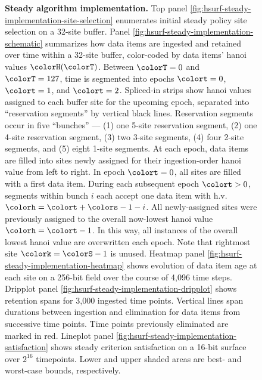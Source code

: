 \begin{figure}[htbp!]
\vspace{-2ex}\caption{%
  \textbf{Steady algorithm implementation.}
  \footnotesize
  Top panel \ref{fig:hsurf-steady-implementation-site-selection} enumerates initial steady policy site selection on a 32-site buffer.
  Panel \ref{fig:hsurf-steady-implementation-schematic} summarizes how data items are ingested and retained over time within a 32-site buffer, color-coded by data items' hanoi values $\colorH(\colorT)$.
  Between $\colorT=0$ and $\colorT=127$, time is segmented into epochs $\colort=0$, $\colort=1$, and $\colort=2$.
  Spliced-in strips show hanoi values assigned to each buffer site for the upcoming epoch, separated into ``reservation segments'' by vertical black lines.
  Reservation segments occur in five ``bunches'' --- (1) one 5-site reservation segment, (2) one 4-site reservation segment, (3) two 3-site segments, (4) four 2-site segments, and (5) eight 1-site segments.
  At each epoch, data items are filled into sites newly assigned for their ingestion-order hanoi value from left to right.
  In epoch $\colort=0$, all sites are filled with a first data item.
  During each subsequent epoch $\colort>0$, segments within bunch $i$ each accept one data item with h.v. $\colorh=\colort + \colors - 1 - i$.
  All newly-assigned sites were previously assigned to the overall now-lowest hanoi value $\colorh=\colort - 1$.
  In this way, all instances of the overall lowest hanoi value are overwritten each epoch.
  Note that rightmost site $\colork=\colorS-1$ is unused.
  Heatmap panel \ref{fig:hsurf-steady-implementation-heatmap} shows evolution of data item age at each site on a 256-bit field over the course of 4,096 time steps.
  Dripplot panel \ref{fig:hsurf-steady-implementation-dripplot} shows retention spans for 3,000 ingested time points.
  Vertical lines span durations between ingestion and elimination for data items from successive time points.
  Time points previously eliminated are marked in red.
  Lineplot panel \ref{fig:hsurf-steady-implementation-satisfaction} shows steady criterion satisfaction on a 16-bit surface over $2^{16}$ timepoints.
  Lower and upper shaded areas are best- and worst-case bounds, respectively.
  }
\label{fig:hsurf-steady-implementation}

\end{figure}
